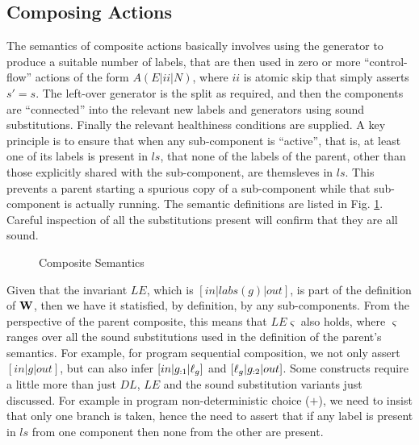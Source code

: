 \subsection{Composing Actions}\label{ssec:composing}

The semantics of composite actions basically involves using the generator
to produce a suitable number of labels,
that are then used in zero or more ``control-flow'' actions
of the form $A(E|ii|N)$, where $ii$ is atomic skip that simply asserts $s'=s$.
The left-over generator is the split as required,
and then the components are ``connected'' into
the relevant new labels and generators using sound substitutions.
Finally the relevant healthiness conditions are supplied.
A key principle is to ensure that when any sub-component is ``active'',
that is, at least one of its labels is present in $ls$,
that none of the labels of the parent,
other than those explicitly shared with the sub-component,
are themsleves in $ls$.
This prevents a parent starting a spurious copy of a sub-component
while that sub-component is actually running.
The semantic definitions are listed in Fig. \ref{fig:composite-semantics}.
Careful inspection of all the substitutions present will confirm that they
are all sound.
\begin{figure}[t]
  \caption{Composite Semantics}
\label{fig:composite-semantics}
\end{figure}
Given that the invariant $LE$, which is $[in|labs(g)|out]$,
is part of the definition of $\mathbf{W}$,
then we have it statisfied, by definition, by any sub-components.
From the perspective of the parent composite, this means that $LE\varsigma$
also holds, where $\varsigma$ ranges over all the sound substitutions
used in the definition of the parent's semantics.
For example, for program sequential composition,
we not only assert $[in|g|out]$,
but can also infer $[in|g_{:1}|\ell_g]$
and $[\ell_g|g_{:2}|out]$.
Some constructs require a little more than just $DL$, $LE$ and the sound substitution
variants just discussed.
For example in program non-deterministic choice ($+$),
we need to insist that only one branch is taken, hence
the need to assert that if any label is present in $ls$ from one component
then none from the other are present.


